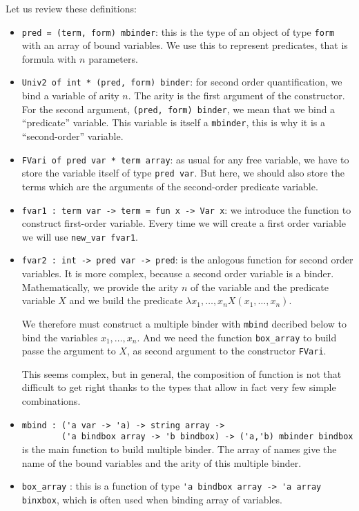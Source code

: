 \documentclass[11pt]{article}
\begin{document}
Let us review these definitions:
\begin{itemize}
\item \verb#pred = (term, form) mbinder#: this is the type of an object
of type \verb#form# with an array of bound variables. We use this to
represent predicates, that is formula with $n$ parameters.

\item \verb#Univ2 of int * (pred, form) binder#: for second order
quantification, we bind a variable of arity $n$. The arity is the
first argument of the constructor. For the second argument,
\verb#(pred, form) binder#, we mean that we bind a ``predicate''
variable. This variable is
itself a \verb#mbinder#, this is why it is a ``second-order'' variable.

\item \verb#FVari of pred var * term array#: as usual
for any free variable, we have to store
the variable itself of type \verb#pred var#.
But here, we should also store the terms which
are the arguments of the second-order predicate variable.

\item \verb#fvar1 : term var -> term = fun x -> Var x#: we introduce the
function to construct first-order variable. Every time we will create
a first order variable we will use \verb#new_var fvar1#.

\item \verb#fvar2 : int -> pred var -> pred#: is the anlogous function for second order
  variables. It is more complex, because a second order variable is a
  binder. Mathematically, we provide the arity $n$ of the variable and the
  predicate variable $X$ and we build the predicate $\lambda
  x_1,\dots,x_n X(x_1,\dots,x_n)$.

  We therefore must construct a multiple binder with \verb#mbind#
  decribed below to bind the variables $x_1,\dots,x_n$. And we need
  the function \verb#box_array# to build passe the argument to $X$,
  as second argument to the constructor \verb#FVari#.

  This seems complex, but in general, the composition of function is
  not that difficult
  to get right thanks to the types that allow in fact very few simple combinations.

\item \verb#mbind : ('a var -> 'a) -> string array ->#\\
  \verb#        ('a bindbox array -> 'b bindbox) -> ('a,'b) mbinder bindbox#\\
  is the main function to build multiple binder. The array of names
  give the name of the bound variables and the arity of this multiple
  binder.

\item \verb#box_array# : this is a function of type
  \verb#'a bindbox array -> 'a array binxbox#, which is often used when
  binding array of variables.

\end{itemize}
\end{document}
